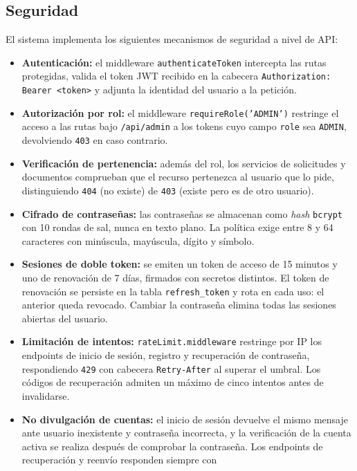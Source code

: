 \subsection{Seguridad}
El sistema implementa los siguientes mecanismos de seguridad a nivel de API:
\begin{itemize}
    \item \textbf{Autenticación:} el middleware \texttt{authenticateToken}
    intercepta las rutas protegidas, valida el token JWT recibido en la
    cabecera \texttt{Authorization: Bearer <token>} y adjunta la identidad
    del usuario a la petición.
    \item \textbf{Autorización por rol:} el middleware
    \texttt{requireRole('ADMIN')} restringe el acceso a las rutas bajo
    \texttt{/api/admin} a los tokens cuyo campo \texttt{role} sea
    \texttt{ADMIN}, devolviendo \texttt{403} en caso contrario.
    \item \textbf{Verificación de pertenencia:} además del rol, los servicios
    de solicitudes y documentos comprueban que el recurso pertenezca al
    usuario que lo pide, distinguiendo \texttt{404} (no existe) de
    \texttt{403} (existe pero es de otro usuario).
    \item \textbf{Cifrado de contraseñas:} las contraseñas se almacenan
    como \emph{hash} \texttt{bcrypt} con 10 rondas de sal, nunca en texto
    plano. La política exige entre 8 y 64 caracteres con minúscula,
    mayúscula, dígito y símbolo.
    \item \textbf{Sesiones de doble token:} se emiten un token de acceso de
    15 minutos y uno de renovación de 7 días, firmados con secretos
    distintos. El token de renovación se persiste en la tabla
    \texttt{refresh\_token} y rota en cada uso: el anterior queda revocado.
    Cambiar la contraseña elimina todas las sesiones abiertas del usuario.
    \item \textbf{Limitación de intentos:} \texttt{rateLimit.middleware}
    restringe por IP los endpoints de inicio de sesión, registro y
    recuperación de contraseña, respondiendo \texttt{429} con cabecera
    \texttt{Retry-After} al superar el umbral. Los códigos de recuperación
    admiten un máximo de cinco intentos antes de invalidarse.
    \item \textbf{No divulgación de cuentas:} el inicio de sesión devuelve el
    mismo mensaje ante usuario inexistente y contraseña incorrecta, y la
    verificación de la cuenta activa se realiza después de comprobar la
    contraseña. Los endpoints de recuperación y reenvío responden siempre con

\end{itemize}
